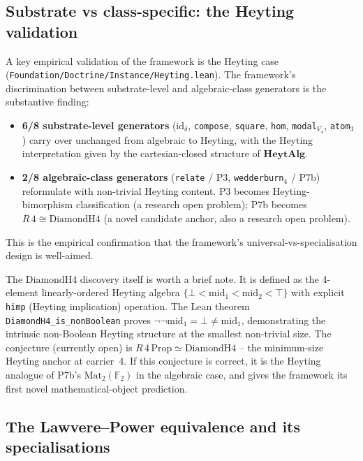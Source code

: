\documentclass[11pt,a4paper]{article}
\theoremstyle{plain}
\theoremstyle{definition}
\theoremstyle{remark}
\newcommand{\F}{\mathbb{F}}
\newcommand{\cat}[1]{\mathbf{#1}}
\newcommand{\HeytAlg}{\cat{HeytAlg}}
\newcommand{\Mat}{\mathrm{Mat}}
\newcommand{\id}{\mathrm{id}}
\newcommand{\DiamondH}{\mathrm{DiamondH4}}
\begin{document}
\subsection{Substrate vs class-specific: the Heyting validation}\label{sec:tgut:heyting-val}

A key empirical validation of the framework is the Heyting case (\texttt{Foundation/Doctrine/Instance/Heyting.lean}). The framework's discrimination between substrate-level and algebraic-class generators is the substantive finding:

\begin{itemize}[leftmargin=*]
\item \textbf{6/8 substrate-level generators} ($\id_\delta$, \texttt{compose}, \texttt{square}, \texttt{hom}, \texttt{modal}$_{V_4}$, \texttt{atom}$_3$) carry over unchanged from algebraic to Heyting, with the Heyting interpretation given by the cartesian-closed structure of $\HeytAlg$.
\item \textbf{2/8 algebraic-class generators} (\texttt{relate} / P3, \texttt{wedderburn}$_4$ / P7b) reformulate with non-trivial Heyting content. P3 becomes Heyting-bimorphism classification (a research open problem); P7b becomes $R\,4 \cong \DiamondH$ (a novel candidate anchor, also a research open problem).
\end{itemize}

This is the empirical confirmation that the framework's universal-vs-specialisation design is well-aimed.

The $\DiamondH$ discovery itself is worth a brief note. It is defined as the 4-element linearly-ordered Heyting algebra $\{\bot < \mathrm{mid}_1 < \mathrm{mid}_2 < \top\}$ with explicit \texttt{himp} (Heyting implication) operation. The Lean theorem \texttt{DiamondH4\_is\_nonBoolean} proves $\neg\neg \mathrm{mid}_1 = \bot \neq \mathrm{mid}_1$, demonstrating the intrinsic non-Boolean Heyting structure at the smallest non-trivial size. The conjecture (currently open) is $R\,4\,\mathrm{Prop} \simeq \DiamondH$ -- the minimum-size Heyting anchor at carrier~4. If this conjecture is correct, it is the Heyting analogue of P7b's $\Mat_2(\F_2)$ in the algebraic case, and gives the framework its first novel mathematical-object prediction.

\subsection{The Lawvere--Power equivalence and its specialisations}\label{sec:tgut:lp}
\end{document}
